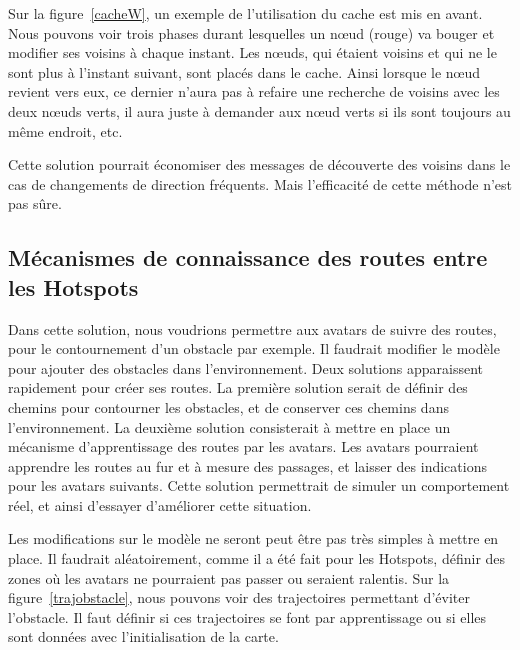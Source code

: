 \par Sur la figure~\ref{cacheW}, un exemple de l'utilisation du cache est mis en avant. Nous pouvons voir trois phases durant lesquelles un nœud (rouge) va bouger et modifier ses voisins à chaque instant. Les nœuds, qui étaient voisins et qui ne le sont plus à l'instant suivant, sont placés dans le cache. Ainsi lorsque le nœud revient vers eux, ce dernier n'aura pas à refaire une recherche de voisins avec les deux nœuds verts, il aura juste à demander aux nœud verts si ils sont toujours au même endroit, etc.
\par Cette solution pourrait économiser des messages de découverte des voisins dans le cas de changements de direction fréquents. Mais l'efficacité de cette méthode n'est pas sûre. 
 
\subsection{Mécanismes de connaissance des routes entre les Hotspots}
Dans cette solution, nous voudrions permettre aux avatars de suivre des routes, pour le contournement d'un obstacle par exemple. Il faudrait modifier le modèle pour ajouter des obstacles dans l'environnement. Deux solutions apparaissent rapidement pour créer ses routes. La première solution serait de définir des chemins pour contourner les obstacles, et de conserver ces chemins dans l'environnement. La deuxième solution consisterait à mettre en place un mécanisme d'apprentissage des routes par les avatars. Les avatars pourraient apprendre les routes au fur et à mesure des passages, et laisser des indications pour les avatars suivants. Cette solution permettrait de simuler un comportement réel, et ainsi d'essayer d'améliorer cette situation.
\par Les modifications sur le modèle ne seront peut être pas très simples à mettre en place. Il faudrait aléatoirement, comme il a été fait pour les Hotspots, définir des zones où les avatars ne pourraient pas passer ou seraient ralentis. Sur la figure~\ref{trajobstacle}, nous pouvons voir des trajectoires permettant d'éviter l'obstacle. Il faut définir si ces trajectoires se font par apprentissage ou si elles sont données avec l'initialisation de la carte.

